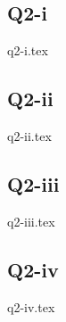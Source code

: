 \documentclass[crop=false,fleqn]{standalone}
\begin{document}
    \subsection*{Q2-i}
    {q2-i.tex}

    \subsection*{Q2-ii}
    {q2-ii.tex}

    \subsection*{Q2-iii}
    {q2-iii.tex}

    \subsection*{Q2-iv}
    {q2-iv.tex}
\end{document}
